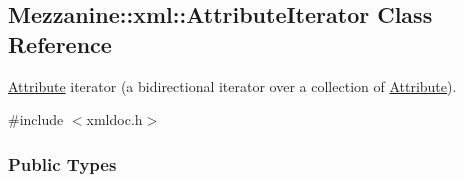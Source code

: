 \hypertarget{classMezzanine_1_1xml_1_1AttributeIterator}{
\subsection{Mezzanine::xml::AttributeIterator Class Reference}
\label{classMezzanine_1_1xml_1_1AttributeIterator}
}


\hyperlink{classMezzanine_1_1xml_1_1Attribute}{Attribute} iterator (a bidirectional iterator over a collection of \hyperlink{classMezzanine_1_1xml_1_1Attribute}{Attribute}).  




{\ttfamily \#include $<$xmldoc.h$>$}

\subsubsection*{Public Types}
